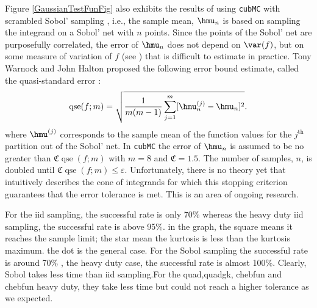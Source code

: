 \documentclass[graybox]{svmult}
\newcommand{\fudge}{\mathfrak{C}}
\DeclareMathOperator{\qse}{qse}
\newcommand{\aMC}{{\tt cubMC}\xspace}
\begin{document}
Figure \ref{GaussianTestFunFig} also exhibits the results of using \aMC with scrambled Sobol' sampling \citep{Owe95,Owe96,Owe97,Mat98,HonHic00a,DicPil10a}, i.e., the sample mean,  $\hmu_n$ is based on sampling the integrand on a Sobol' net with $n$ points.  Since the points of the Sobol' net are purposefully correlated, the error of $\hmu_n$ does not depend on $\var(f)$, but on some measure of variation of $f$ (see \citep{Owe95,Owe96,Owe97,DicPil10a}) that is difficult to estimate in practice.  Tony Warnock and John Halton proposed the following error bound estimate, called the quasi-standard error \citep{Hal05a,Owe06a}:
\begin{equation} \label{qsedef}
\qse(f;m) = \sqrt{\frac{1}{m(m-1)} \sum_{j=1}^m  [\hmu^{(j)}_n - \hmu_n]^2}.
\end{equation}
where $\hmu^{(j)}$ corresponds to the sample mean of the function values for the $j^{\text{th}}$ partition out of the Sobol' net.  In \aMC the error of $\hmu_n$ is assumed to be no greater than  $\fudge \qse(f;m)$ with $m=8$ and $\fudge=1.5$.  The number of samples, $n$, is doubled until $\fudge \qse(f;m) \le \varepsilon$.  Unfortunately, there is no theory yet that intuitively describes the cone of integrands for which this stopping criterion guarantees that the error tolerance is met.  This is an area of ongoing research.

For the iid sampling, the successful rate is only 70\% whereas the heavy duty iid sampling, the successful 
rate is above 95\%. in the graph, the square means it reaches the sample limit; the star mean the kurtosis is less than the kurtosis maximum. the dot is the general case.
For the Sobol sampling the successful rate is around 70\% , the heavy duty case, the successful rate is almost 100\%. Clearly, Sobol takes less time than iid sampling.For the quad,quadgk, chebfun and chebfun heavy duty, they take less time but could not reach a higher tolerance as we expected.
\end{document}
